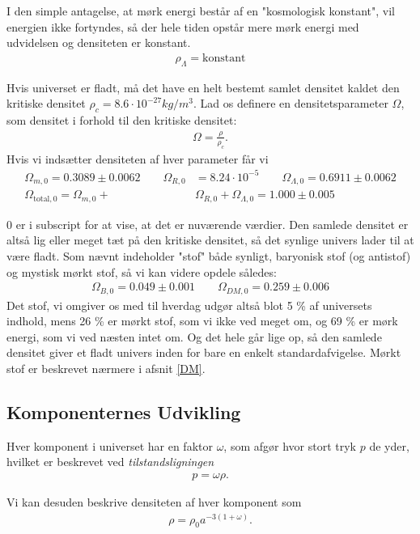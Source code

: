 I den simple antagelse, at mørk energi består af en "kosmologisk konstant", vil energien ikke fortyndes, så der hele tiden opstår mere mørk energi med udvidelsen og densiteten er konstant.
\begin{align}
\rho_\Lambda = \text{konstant}
\end{align}

Hvis universet er fladt, må det have en helt bestemt samlet densitet kaldet den kritiske densitet $\rho_c = 8.6\cdot 10^{-27} kg/m^3$. Lad os definere en densitetsparameter $\Omega$, som densitet i forhold til den kritiske densitet:
\begin{align}
\Omega=\frac{\rho}{\rho_c}.
\end{align}
Hvis vi indsætter densiteten af hver parameter får vi
\begin{align}
\Omega_{m,0}=0.3089\pm 0.0062\qquad
\Omega_{R,0}&=8.24\cdot 10^{-5}\qquad
\Omega_{\Lambda,0}=0.6911\pm 0.0062\\
\Omega_{\text{total},0}=\Omega_{m,0} + &\Omega_{R,0} + \Omega_{\Lambda,0}=1.000\pm0.005 \label{Omegatot}
\end{align}

0 er i subscript for at vise, at det er nuværende værdier. Den samlede densitet er altså lig eller meget tæt på den kritiske densitet, så det synlige univers lader til at være fladt. Som nævnt indeholder "stof" både synligt, baryonisk stof (og antistof) og mystisk mørkt stof, så vi kan videre opdele således:
\begin{align}
\Omega_{B,0}=0.049\pm 0.001\qquad
\Omega_{DM,0}=0.259\pm 0.006
\end{align}
Det stof, vi omgiver os med til hverdag udgør altså blot 5 \% af universets indhold, mens 26 \% er mørkt stof, som vi ikke ved meget om, og 69 \% er mørk energi, som vi ved næsten intet om. Og det hele går lige op, så den samlede densitet giver et fladt univers inden for bare en enkelt standardafvigelse. Mørkt stof er beskrevet nærmere i afsnit \ref{DM}.

\subsection{Komponenternes Udvikling}
Hver komponent i universet har en faktor $\omega$, som afgør hvor stort tryk $p$ de yder, hvilket er beskrevet ved \emph{tilstandsligningen}
\begin{align}
p=\omega \rho.
\end{align}

Vi kan desuden beskrive densiteten af hver komponent som
\begin{align}
\rho = \rho_0 a^{-3(1+\omega)}. \label{density}
\end{align}

